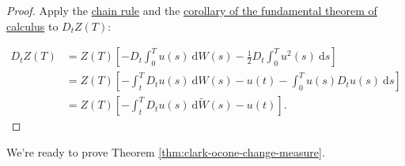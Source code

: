 \begin{proof}
	Apply the \hyperref[thm:chain_rule]{chain rule} and the \hyperref[cor:202401111429]{corollary of the fundamental theorem of calculus} to $D_t Z(T)$:
	
	\begin{equation*}
		\begin{aligned}
		D_t Z(T) & =Z(T)\left[-D_t \int_0^T u(s) ~\mathrm{d} W(s)-\frac{1}{2} D_t \int_0^T u^2(s) ~\mathrm{d} s\right] \\
		& =Z(T)\left[-\int_t^T D_t u(s) ~\mathrm{d} W(s)-u(t)-\int_0^T u(s) D_t u(s) ~\mathrm{d} s\right] \\
		& =Z(T)\left[-\int_t^T D_t u(s) ~\mathrm{d} \widetilde{W}(s)-u(t)\right] .
		\end{aligned}
	\end{equation*}
\end{proof}

We're ready to prove Theorem \ref{thm:clark-ocone-change-measure}.

